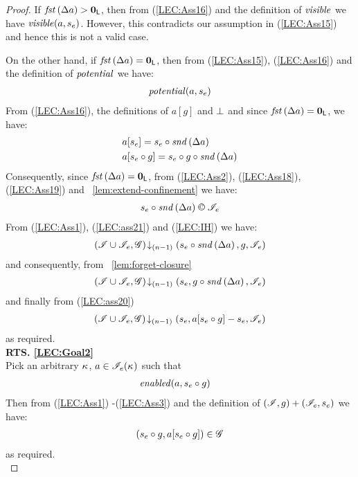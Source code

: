 \begin{lemma}
\begin{proof}
If $\mathit{fst}\left(\Delta {a}\right) > \mathbf{0}_{\textsf{L}}$, then from (\ref{LEC:Ass16}) and the definition of $\mathit{visible}$ we have $\mathit{visible}(a, s_e)$. However, this contradicts our assumption in (\ref{LEC:Ass15}) and hence this is not a valid case.

On the other hand, if $\mathit{fst}\left(\Delta {a}\right) = \mathbf{0}_{\textsf{L}}$, then from (\ref{LEC:Ass15}), (\ref{LEC:Ass16}) and the definition of $\mathit{potential}$ we have:
%
\begin{align}
	\mathit{potential}(a, s_e) \label{LEC:Ass18}
\end{align}
%
From (\ref{LEC:Ass16}), the definitions of $a[g]$ and $\mathrel{\bot}$ and since $\mathit{fst}\left(\Delta {a}\right) = \mathbf{0}_{\textsf{L}}$, we have: 
%
\begin{align}
	& a[s_e] = s_e \circ \mathit{snd}\left(\Delta {a}\right) \label{LEC:Ass19}\\
	& a[s_e \circ g] = s_e \circ g \circ \mathit{snd}\left(\Delta {a}\right) \label{LEC:ass20}
\end{align}
%
Consequently, since $\mathit{fst}\left(\Delta {a}\right) = \mathbf{0}_{\textsf{L}}$, from (\ref{LEC:Ass2}), (\ref{LEC:Ass18}), (\ref{LEC:Ass19}) and \lem~\ref{lem:extend-confinement} we have:
%
\begin{align}
	s_e \composeL \snd{\updateFP{a}} \confines \lmod_e  \label{LEC:ass21}
\end{align}
%
From (\ref{LEC:Ass1}), (\ref{LEC:ass21}) and (\ref{LEC:IH}) we have:
%
\begin{align*}
	\left(\mathscr{I} \cup \mathscr{I}_{e}, \mathscr{G}\right) \!\downarrow_{(n-1)} \left(s_e \circ \mathit{snd}\left(\Delta {a}\right), g, \mathscr{I}_e\right)
\end{align*}
%
and consequently, from \lem~\ref{lem:forget-closure}
%
\begin{align*}
	\left(\mathscr{I} \cup \mathscr{I}_{e}, \mathscr{G}\right) \!\downarrow_{(n-1)} \left(s_e, g \circ \mathit{snd}\left(\Delta {a}\right), \mathscr{I}_e\right)
\end{align*}
%
and finally from (\ref{LEC:ass20})
%
\begin{align*}
	\left(\mathscr{I} \cup \mathscr{I}_{e}, \mathscr{G}\right) \!\downarrow_{(n-1)} \left(s_e, a[s_e  \circ g] - s_e, \mathscr{I}_e\right)
\end{align*}
%
as required.\\
%
%
%

\noindent\textbf{RTS. \ref{LEC:Goal2}}\\
Pick an arbitrary $\kappa_{}$, $a \in \mathscr{I}_e(\kappa_{})$ such that
%
\begin{align}
	& \mathit{enabled}(a, s_e \circ g) \label{LEC:Ass20}
\end{align}
Then from (\ref{LEC:Ass1}) -(\ref{LEC:Ass3}) and the definition of $(\mathscr{I}, g) + (\mathscr{I}_e, s_e)$ we have:
%
\begin{align*}
	(s_e \circ g, a[s_e \circ g]) \in \mathscr{G}
\end{align*}
%
as required.\\
%
%
%


\end{proof}
\end{lemma}
